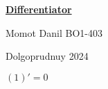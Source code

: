 \documentclass[a4paper,12pt]{article} %
\begin{document}
    \begin{titlepage}
    {\huge
    \begin{center}
    \underline{{\bf Differentiator}}
    \vspace{1cm}
    
    \end{center}
    }
    \vspace{2cm}
    \begin{center}
    
    
    {\LARGE Momot Danil
    \vspace{0.2cm}
    BO1-403}
    \end{center}
    \vspace{9.5cm}
    \begin{center}
        Dolgoprudnuy 2024
    \end{center}
    \end{titlepage}
$({1})' = {0}$
\end{document}
